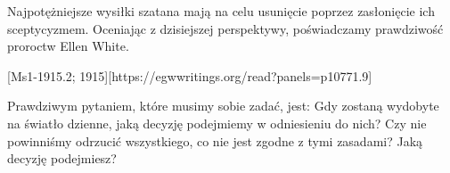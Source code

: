Najpotężniejsze wysiłki szatana mają na celu usunięcie  poprzez zasłonięcie ich sceptycyzmem. Oceniając z dzisiejszej perspektywy, poświadczamy prawdziwość proroctw Ellen White.

[Ms1-1915.2; 1915][https://egwwritings.org/read?panels=p10771.9]

Prawdziwym pytaniem, które musimy sobie zadać, jest: Gdy  zostaną wydobyte na światło dzienne, jaką decyzję podejmiemy w odniesieniu do nich? Czy nie powinniśmy odrzucić wszystkiego, co nie jest zgodne z tymi zasadami? Jaką decyzję podejmiesz?


